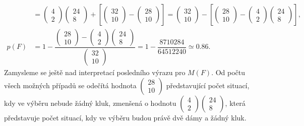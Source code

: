 \begin{example}
\begin{align*}
           &= \begin{pmatrix}  4 \\ 2 \end{pmatrix}\begin{pmatrix} 24 \\ 8 \end{pmatrix} + 
              \left[\begin{pmatrix}  32 \\ 10 \end{pmatrix} - 
                    \begin{pmatrix}  28 \\ 10 \end{pmatrix}
              \right]
            = \begin{pmatrix} 32 \\ 10 \end{pmatrix} - 
              \left[\begin{pmatrix} 28 \\ 10 \end{pmatrix} - 
                    \begin{pmatrix}  4 \\  2 \end{pmatrix}
                    \begin{pmatrix} 24 \\  8 \end{pmatrix}
              \right],                                                                          \\
      p(F) &= 1 - \dfrac{\begin{pmatrix} 28 \\ 10 \end{pmatrix} -
                         \begin{pmatrix}  4 \\  2 \end{pmatrix}
                         \begin{pmatrix} 24 \\  8 \end{pmatrix}
                        }
                        {\begin{pmatrix} 32 \\ 10 \end{pmatrix}}
            = 1 - \dfrac{\num{8710284}}{\num{64512240}} \simeq \num{0.86}.
    \end{align*}
    Zamysleme se ještě nad interpretací posledního výrazu pro \(M(F)\). Od počtu všech možných 
    případů se odečítá hodnota \(\begin{pmatrix} 28 \\ 10 \end{pmatrix}\) představující počet 
    situací, kdy ve výběru nebude žádný kluk, zmenšená o hodnotu \(\begin{pmatrix} 4 \\ 2 
    \end{pmatrix}\begin{pmatrix} 24 \\ 8 \end{pmatrix}\), která představuje počet situací, kdy ve 
    výběru budou právě dvě dámy a žádný kluk.
  \normalsize
\end{example}